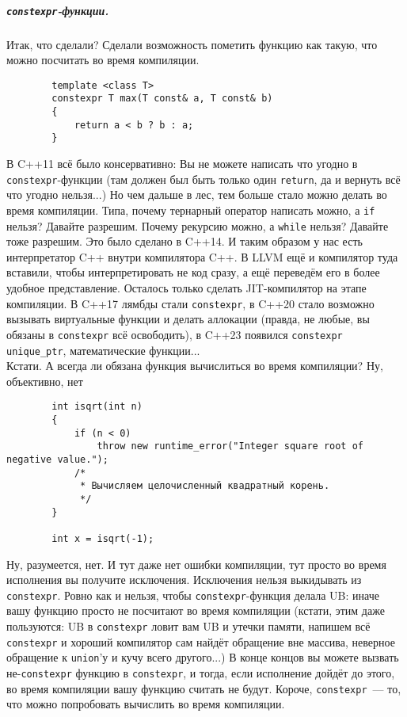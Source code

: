 \documentclass{article}
\begin{document}
    \subparagraph{\texttt{constexpr}-функции.}
    Итак, что сделали? Сделали возможность пометить функцию как такую, что можно посчитать во время компиляции.
    \begin{verbatim}
        template <class T>
        constexpr T max(T const& a, T const& b)
        {
            return a < b ? b : a;
        }
    \end{verbatim}
    В C++11 всё было консервативно: Вы не можете написать что угодно в \texttt{constexpr}-функции (там должен был быть только один \texttt{return}, да и вернуть всё что угодно нельзя...) Но чем дальше в лес, тем больше стало можно делать во время компиляции. Типа, почему тернарный оператор написать можно, а \texttt{if} нельзя? Давайте разрешим. Почему рекурсию можно, а \texttt{while} нельзя? Давайте тоже разрешим. Это было сделано в C++14. И таким образом у нас есть интерпретатор C++ внутри компилятора C++. В LLVM ещё и компилятор туда вставили, чтобы интерпретировать не код сразу, а ещё переведём его в более удобное представление. Осталось только сделать JIT-компилятор на этапе компиляции. В C++17 лямбды стали \texttt{constexpr}, в C++20 стало возможно вызывать виртуальные функции и делать аллокации (правда, не любые, вы обязаны в \texttt{constexpr} всё освободить), в C++23 появился \texttt{constexpr} \texttt{unique_ptr}, математические функции...\\
    Кстати. А всегда ли обязана функция вычислиться во время компиляции? Ну, объективно, нет
    \begin{verbatim}
        int isqrt(int n)
        {
            if (n < 0)
                throw new runtime_error("Integer square root of negative value.");
            /*
             * Вычисляем целочисленный квадратный корень.
             */
        }

        int x = isqrt(-1);
    \end{verbatim}
    Ну, разумеется, нет. И тут даже нет ошибки компиляции, тут просто во время исполнения вы получите исключения. Исключения нельзя выкидывать из \texttt{constexpr}. Ровно как и нельзя, чтобы \texttt{constexpr}-функция делала UB: иначе вашу функцию просто не посчитают во время компиляции (кстати, этим даже пользуются: UB в \texttt{constexpr} ловит вам UB и утечки памяти, напишем всё \texttt{constexpr} и хороший компилятор сам найдёт обращение вне массива, неверное обращение к \texttt{union}'у и кучу всего другого...) В конце концов вы можете вызвать не-\texttt{constexpr} функцию в \texttt{constexpr}, и тогда, если исполнение дойдёт до этого, во время компиляции вашу функцию считать не будут. Короче, \texttt{constexpr}~--- то, что можно попробовать вычислить во время компиляции.\\
\end{document}
